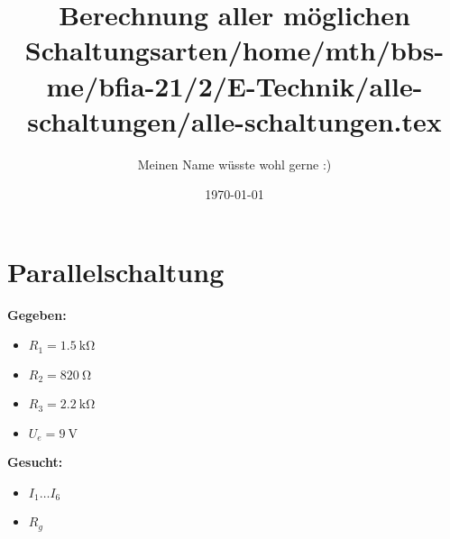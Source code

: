\documentclass[12pt,a4paper]{amsart}
\begin{document}
\title{\textbf{Berechnung aller möglichen Schaltungsarten/home/mth/bbs-me/bfia-21/2/E-Technik/alle-schaltungen/alle-schaltungen.tex}}
\author{Meinen Name wüsste wohl gerne :)}
\date{\today}

\maketitle

\section{Parallelschaltung}
\textbf{Gegeben:}
\begin{itemize}
  \item $R_1 = \qty{1.5}\kohm$
  \item $R_2 = \qty{820}\ohm$
  \item $R_3 = \qty{2.2}\kohm$
  \item $U_e = \qty{9}\volt$
\end{itemize}

\textbf{Gesucht:}
\begin{itemize}
  \item $I_1 \dots I_6$
  \item $R_g$
\end{itemize}
\end{document}
